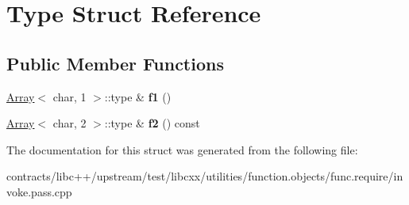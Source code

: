 \hypertarget{struct_type}{}\section{Type Struct Reference}
\label{struct_type}
\subsection*{Public Member Functions}
\begin{DoxyCompactItemize}
\item 
\mbox{\label{struct_type_af98ba83418bb86b5657b938ae9842ee0}} 
\mbox{\hyperlink{struct_array}{Array}}$<$ char, 1 $>$\+::type \& {\bfseries f1} ()
\item 
\mbox{\label{struct_type_a9ac58ba7b80cbc4b1c8bfb2338fd0423}} 
\mbox{\hyperlink{struct_array}{Array}}$<$ char, 2 $>$\+::type \& {\bfseries f2} () const
\end{DoxyCompactItemize}


The documentation for this struct was generated from the following file\+:\begin{DoxyCompactItemize}
\item 
contracts/libc++/upstream/test/libcxx/utilities/function.\+objects/func.\+require/invoke.\+pass.\+cpp\end{DoxyCompactItemize}
